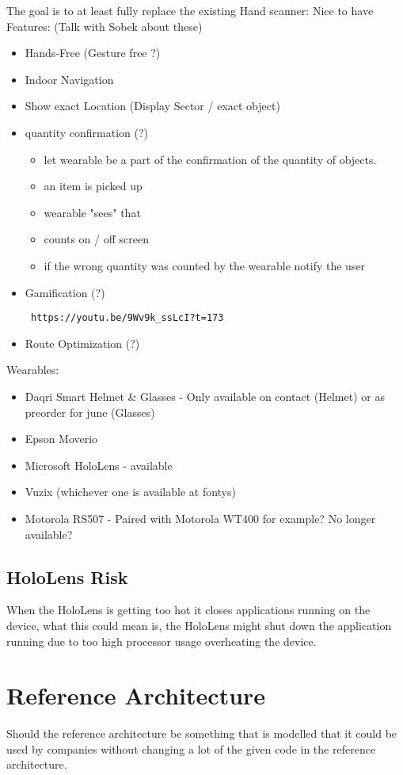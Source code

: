 \documentclass{report}
\begin{document}
The goal is to at least fully replace the existing Hand scanner:
Nice to have Features: (Talk with Sobek about these)
\begin{itemize}
	\item Hands-Free (Gesture free ?)
	\item Indoor Navigation
	\item Show exact Location (Display Sector / exact object)
	\item quantity confirmation (?)
	\begin{itemize}
		\item let wearable be a part of the confirmation of the quantity of objects.
		\item an item is picked up
		\item wearable "sees" that
		\item counts on / off screen
		\item if the wrong quantity was counted by the wearable notify the user
	\end{itemize}
	\item Gamification (?) \begin{verbatim} https://youtu.be/9Wv9k_ssLcI?t=173 \end{verbatim}
	\item Route Optimization (?)
\end{itemize}

Wearables:
\begin{itemize}
	\item Daqri Smart Helmet \& Glasses - Only available on contact (Helmet) or as preorder for june (Glasses)
	\item Epson Moverio
	\item Microsoft HoloLens - available
	\item Vuzix (whichever one is available at fontys)
	\item Motorola RS507 - Paired with Motorola WT400 for example? No longer available?
\end{itemize}

\section{HoloLens Risk}
When the HoloLens is getting too hot it closes applications running on the device, what this could mean is, the HoloLens might shut down the application running due to too high processor usage overheating the device.

\chapter{Reference Architecture}
Should the reference architecture be something that is modelled that it could be used by companies without changing a lot of the given code in the reference architecture. 
\end{document}
